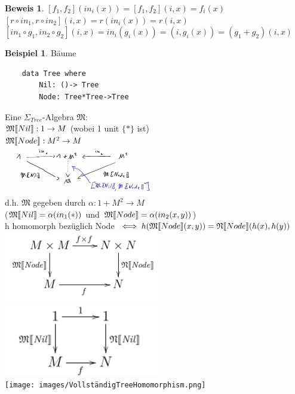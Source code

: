 \documentclass{article}
\theoremstyle{definition}
\newtheorem{beweis}{Beweis}[section]
\newtheorem{beispiel}{Beispiel}[section]
\begin{document}
	\begin{beweis}
	$[f_1, f_2](in_i(x))=[f_1,f_2](i,x) = f_i(x)$\\
	$[r\circ in_1, r\circ in_2](i,x)= r(in_i(x)) = r(i,x)$\\
	$[in_1\circ g_1, in_2\circ g_2](i,x) = in_i(g_i(x)) = (i,g_i(x)) = (g_1+g_2)(i,x)$
	\end{beweis}
	\begin{beispiel} Bäume\\
	\begin{verbatim}
	data Tree where
		Nil: ()-> Tree
		Node: Tree*Tree->Tree
	\end{verbatim}
	Eine $\Sigma_{Tree}$-Algebra $\mathfrak{M}$:\\
	$\mathfrak{M}\llbracket Nil\rrbracket: 1\to M$ (wobei 1 unit $\{*\}$ ist)\\
	$\mathfrak{M}\llbracket Node\rrbracket:M^2\to M$\\
	\includegraphics[width=256px]{images/TreeAlgebra.png}\\
	d.h. $\mathfrak{M}$ gegeben durch $\alpha:1+M^2\to M$\\
	($\mathfrak{M}\llbracket Nil\rrbracket=\alpha(in_1(*))$ und $\mathfrak{M}\llbracket Node\rrbracket=\alpha(in_2(x,y))$)\\
	h homomorph bezüglich Node $\iff h(\mathfrak{M}\llbracket Node\rrbracket(x,y)) = \mathfrak{N}\llbracket Node\rrbracket(h(x),h(y))$\\
	\includegraphics[width=256px]{images/TreeHomomorphism.png}\\
	\includegraphics[width=256px]{images/TreeHomomorphismNil.png}\\
	\texttt{[image: images/VollständigTreeHomomorphism.png]}\\

\end{beispiel}
\end{document}
